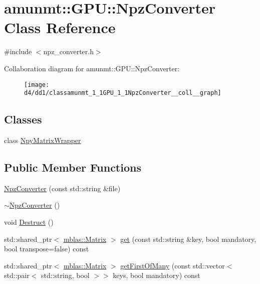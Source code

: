 \hypertarget{classamunmt_1_1GPU_1_1NpzConverter}{}\section{amunmt\+:\+:G\+PU\+:\+:Npz\+Converter Class Reference}
\label{classamunmt_1_1GPU_1_1NpzConverter}


{\ttfamily \#include $<$npz\+\_\+converter.\+h$>$}



Collaboration diagram for amunmt\+:\+:G\+PU\+:\+:Npz\+Converter\+:
\nopagebreak
\begin{figure}[H]
\begin{center}
\leavevmode
\texttt{[image: d4/dd1/classamunmt\_1\_1GPU\_1\_1NpzConverter\_\_coll\_\_graph]}
\end{center}
\end{figure}
\subsection*{Classes}
\begin{DoxyCompactItemize}
\item 
class \hyperlink{classamunmt_1_1GPU_1_1NpzConverter_1_1NpyMatrixWrapper}{Npy\+Matrix\+Wrapper}
\end{DoxyCompactItemize}
\subsection*{Public Member Functions}
\begin{DoxyCompactItemize}
\item 
\hyperlink{classamunmt_1_1GPU_1_1NpzConverter_a8224784edd4b369216e414bcead20c4a}{Npz\+Converter} (const std\+::string \&file)
\item 
\hyperlink{classamunmt_1_1GPU_1_1NpzConverter_abde0ffc848f1290870b4b6c7336626a5}{$\sim$\+Npz\+Converter} ()
\item 
void \hyperlink{classamunmt_1_1GPU_1_1NpzConverter_af38fa6db0c029115fc19f3360303b1de}{Destruct} ()
\item 
std\+::shared\+\_\+ptr$<$ \hyperlink{namespaceamunmt_1_1GPU_1_1mblas_ab67821a8254de53e45a623cf73c0aef6}{mblas\+::\+Matrix} $>$ \hyperlink{classamunmt_1_1GPU_1_1NpzConverter_a26aeafd22013bc125b82b6a0ff80da8b}{get} (const std\+::string \&key, bool mandatory, bool transpose=false) const 
\item 
std\+::shared\+\_\+ptr$<$ \hyperlink{namespaceamunmt_1_1GPU_1_1mblas_ab67821a8254de53e45a623cf73c0aef6}{mblas\+::\+Matrix} $>$ \hyperlink{classamunmt_1_1GPU_1_1NpzConverter_a01dd60fd9a2c429e3ca254306f0780eb}{get\+First\+Of\+Many} (const std\+::vector$<$ std\+::pair$<$ std\+::string, bool $>$$>$ keys, bool mandatory) const 
\end{DoxyCompactItemize}
